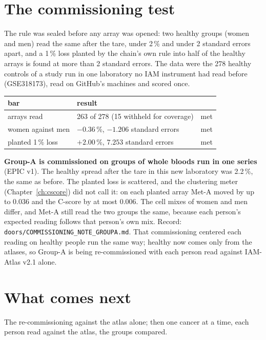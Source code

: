\section{The commissioning test}

The rule was sealed before any array was opened: two healthy groups (women and men) read the same after the tare, under 2\,\% and under
2 standard errors apart, and a 1\,\% loss planted by the chain's own rule into half of the healthy arrays is found at more than 2 standard
errors. The data were the 278 healthy controls of a study run in one laboratory no IAM instrument had read before (GSE318173), read on
GitHub's machines and scored once.

\begin{center}
\begin{tabular}{lll}
\hline
bar & result & \\
\hline
arrays read & 263 of 278 (15 withheld for coverage) & met \\
women against men & $-0.36$\,\%, $-1.206$ standard errors & met \\
planted 1\,\% loss & $+2.00$\,\%, $7.253$ standard errors & met \\
\hline
\end{tabular}
\end{center}

\textbf{Group-A is commissioned on groups of whole bloods run in one series} (EPIC v1). The healthy spread after the tare in
this new laboratory was 2.2\,\%, the same as before. The planted loss is scattered, and the clustering meter (Chapter~\ref{ch:cscore}) did
not call it: on each planted array Met-A moved by up to 0.036 and the C-score by at most 0.006. The cell mixes of women and men differ, and
Met-A still read the two groups the same, because each person's expected reading follows that person's own mix. Record:
\texttt{doors/COMMISSIONING\_NOTE\_GROUPA.md}. That commissioning centered each reading on healthy people run the same way; healthy now comes only from the atlases, so Group-A is being re-commissioned with each person read against IAM-Atlas v2.1 alone.

\section{What comes next}

The re-commissioning against the atlas alone; then one cancer at a time, each person read against the atlas, the groups compared.
